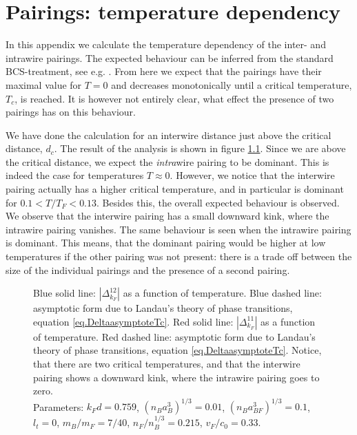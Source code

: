\chapter{Pairings: temperature dependency} %

\label{Appendix.pairingtemperaturedependency} 


In this appendix we calculate the temperature dependency of the inter- and intrawire pairings. The expected behaviour can be inferred from the standard BCS-treatment, see e.g. \cite[p. 369]{PlischkeStatPhys}. From here we expect that the pairings have their maximal value for $T = 0$ and decreases monotonically until a critical temperature, $T_c$, is reached. It is however not entirely clear, what effect the presence of two pairings has on this behaviour. 

We have done the calculation for an interwire distance just above the critical distance, $d_c$. The result of the analysis is shown in figure \ref{fig.maximalpairingsTdepend_2wires}. Since we are above the critical distance, we expect the \textit{intra}wire pairing to be dominant. This is indeed the case for temperatures $T \approx 0$. However, we notice that the interwire pairing actually has a higher critical temperature, and in particular is dominant for $0.1 < T / T_F < 0.13$. Besides this, the overall expected behaviour is observed. We observe that the interwire pairing has a small downward kink, where the intrawire pairing vanishes. The same behaviour is seen when the intrawire pairing is dominant. This means, that the dominant pairing would be higher at low temperatures if the other pairing was not present: there is a trade off between the size of the individual pairings and the presence of a second pairing.

\begin{figure} 
\begin{center}  
  
\caption{Blue solid line: $|\Delta^{12}_{k_F}|$ as a function of temperature. Blue dashed line: asymptotic form due to Landau's theory of phase transitions, equation \eqref{eq.DeltaasymptoteTc}. Red solid line: $|\Delta^{11}_{k_F}|$ as a function of temperature. Red dashed line: asymptotic form due to Landau's theory of phase transitions, equation \eqref{eq.DeltaasymptoteTc}. Notice, that there are two critical temperatures, and that the interwire pairing shows a downward kink, where the intrawire pairing goes to zero. \\
Parameters: $k_Fd = 0.759$, $(n_Ba_B^3)^{1/3} = 0.01$, $(n_Ba_{BF}^3)^{1/3} = 0.1$, $l_t = 0$, $m_B / m_F = 7/40$, $n_F / n_B^{1/3} = 0.215$, $v_F / c_0 = 0.33$.}  
\label{fig.maximalpairingsTdepend_2wires}  
\end{center}    
\end{figure}

